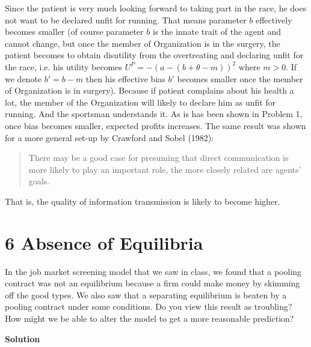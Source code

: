 \documentclass[a4paper]{article}
\begin{document}
		Since the patient is very much looking forward to taking part in the race, he does not want to be declared unfit for running. That means parameter $b$ effectively becomes smaller (of course parameter $b$ is the innate trait of the agent and cannot change, but once the member of Organization is in the surgery, the patient becomes to obtain disutility from the overtreating and declaring unfit for the race, i.e. his utility becomes $U^P = - (a - (b + \theta - m))^2$ where $m > 0$. If we denote $b' = b - m$ then his effective bias $b'$ becomes smaller once the member of Organization is in surgery). Because if patient complains about his health a lot, the member of the Organization will likely to declare him as unfit for running. And the sportsman understands it. As is has been shown in Problem 1, once bias becomes smaller, expected profits increases. The same result was shown for a more general set-up by Crawford and Sobel (1982):
		\begin{quote}
			There may be a good case for presuming that direct communication is more likely to play an important role, the more closely related are agents' goals.
		\end{quote}
	That is, the quality of information transmission is likely to become higher.
		
		
		\section*{6 Absence of Equilibria}
			In the job market screening model that we saw in class, we found that a pooling contract
			was not an equilibrium because a firm could make money by skimming off the good types.
			We also saw that a separating equilibrium is beaten by a pooling contract under some
			conditions. Do you view this result as troubling? How might we be able to alter the
			model to get a more reasonable prediction?

			
			
			\textbf{Solution}
			
\end{document}
